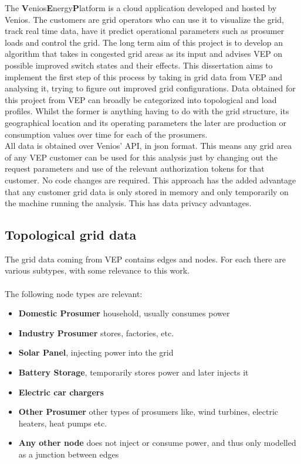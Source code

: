 The \textbf{V}enios\textbf{E}nergy\textbf{P}latform is a cloud application
developed and hosted by Venios. The customers are grid operators who can use
it to visualize the grid, track real time data, have it predict 
operational parameters such as prosumer loads and control the grid.
The long term aim of this project is to develop an algorithm that takes in
congested grid areas as its input and advises VEP on possible improved
switch states and their effects. This dissertation aims to implement the first step of this
process by taking in grid data from VEP and analysing it, trying to figure out
improved grid configurations. Data obtained for this project from VEP can broadly
be categorized
into topological and load profiles. Whilst the former is anything having to do with
the grid structure, its geographical location and its operating parameters the later
are production or consumption values over time for each of the prosumers.\\
All data is obtained over Venios' API, in json format. This means any
grid area of any VEP customer can be used for this analysis just by changing out
the request parameters and use of the relevant authorization tokens for that customer.
No code changes are required. This approach has the added advantage that any customer grid
data is only stored in memory and only temporarily on the machine running the analysis. This
has data privacy advantages.

\subsection{Topological grid data}

The grid data coming from VEP contains edges and nodes. For each there are various subtypes, with some relevance
to this work.\\
\\
The following node types are relevant:
\begin{itemize}
    \item \textbf{Domestic Prosumer} household, usually consumes power
    \item \textbf{Industry Prosumer} stores, factories, etc.
    \item \textbf{Solar Panel}, injecting power into the grid
    \item \textbf{Battery Storage}, temporarily stores power and later injects it
    \item \textbf{Electric car chargers}
    \item \textbf{Other Prosumer} other types of prosumers like, wind turbines, electric heaters, heat pumps etc. 
    \item \textbf{Any other node} does not inject or consume power, and thus only modelled as a junction between edges
\end{itemize}

